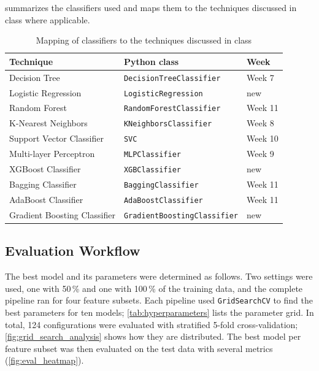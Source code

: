  summarizes the classifiers used and maps them to the techniques discussed in class where
applicable.
\begin{table}[H]
    \centering
    \begin{tabular}{lll}
        \toprule
        \textbf{Technique}           & \textbf{Python class}                    & \textbf{Week} \\
        \midrule
        Decision Tree                & \texttt{DecisionTreeClassifier}          & Week 7  \\
        Logistic Regression          & \texttt{LogisticRegression}              & new     \\
        Random Forest                & \texttt{RandomForestClassifier}          & Week 11 \\
        K-Nearest Neighbors          & \texttt{KNeighborsClassifier}            & Week 8  \\
        Support Vector Classifier    & \texttt{SVC}                             & Week 10 \\
        Multi-layer Perceptron       & \texttt{MLPClassifier}                   & Week 9  \\
        XGBoost Classifier           & \texttt{XGBClassifier}                   & new     \\
        Bagging Classifier           & \texttt{BaggingClassifier}               & Week 11 \\
        AdaBoost Classifier          & \texttt{AdaBoostClassifier}              & Week 11 \\
        Gradient Boosting Classifier & \texttt{GradientBoostingClassifier}      & new     \\
        \bottomrule
    \end{tabular}
    \caption{Mapping of classifiers to the techniques discussed in class}
    \label{tab:classifiers}
\end{table}

\subsection{Evaluation Workflow}\label{ss:evaluation}
The best model and its parameters were determined as follows. Two settings were used, one with 50\,\% and one with
100\,\% of the training data, and the complete pipeline ran for four feature subsets. Each pipeline used
\texttt{GridSearchCV} to find the best parameters for ten models; \cref{tab:hyperparameters} lists the parameter
grid. In total, 124 configurations were evaluated with stratified 5-fold cross-validation;
\cref{fig:grid_search_analysis} shows how they are distributed. The best model per feature subset was then evaluated
on the test data with several metrics (\cref{fig:eval_heatmap}).

